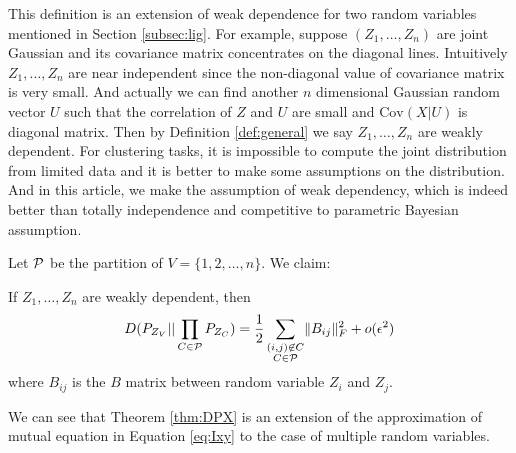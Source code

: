This definition is an extension of weak dependence for two random variables mentioned in Section \ref{subsec:lig}.
For example, suppose $(Z_1, \dots, Z_n)$ are joint Gaussian and its covariance matrix concentrates on the diagonal lines.
Intuitively $Z_1, \dots, Z_n$ are near independent since the non-diagonal value of covariance matrix is very small. 
And actually we can find another $n$ dimensional Gaussian random vector $U$ such that the correlation of $Z$ and $U$ are small
and $\mathrm{Cov}(X|U)$ is diagonal matrix. Then by Definition \ref{def:general} we say $Z_1, \dots, Z_n$ are weakly dependent.
For clustering tasks, it is impossible to compute the joint distribution from limited data and it is better to make some
assumptions on the distribution. And in this article, we make the assumption of weak dependency, which is indeed better than totally
independence and competitive to parametric Bayesian assumption.

Let $\P$ be the partition of $V=\{1,2,\dots, n\}$. We claim:
\begin{theorem}\label{thm:DPX}
If $Z_1, \dots, Z_n$ are weakly dependent, then
\begin{equation}\label{eq:PXV}
D(P_{Z_V} || \prod_{C\in \P} P_{Z_{C}}) = {1 \over 2}\sum_{\substack{(i,j) \not\in C\\ C\in \P}} \norm{B_{ij}}_F^2 + o(\epsilon^2)
\end{equation}
where $B_{ij}$ is the $B$ matrix between random variable $Z_i$ and $Z_j$.
\end{theorem}
We can see that Theorem \ref{thm:DPX} is an extension of the approximation of mutual equation in Equation \eqref{eq:Ixy} to the case of multiple random variables.


